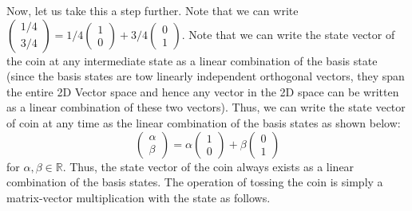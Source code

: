 \documentclass[12pt, oneside]{book}
\theoremstyle{definition}
\theoremstyle{definition}
\theoremstyle{remark}
\begin{document}
Now, let us take this a step further. Note that we can write $\begin{pmatrix} 1/4 \\ 3/4 \end{pmatrix} = 1/4 \begin{pmatrix} 1 \\ 0 \end{pmatrix} + 3/4 \begin{pmatrix} 0 \\1\end{pmatrix}$. Note that we can write the state vector of the coin at any intermediate state as a linear combination of the basis state (since the basis states are tow linearly independent orthogonal vectors, they span the entire 2D Vector space and hence any vector in the 2D space can be written as a linear combination of these two vectors). Thus, we can write the state vector of coin at any time as the linear combination of the basis states as shown below:
\[
\begin{pmatrix} \alpha \\ \beta \end{pmatrix} = \alpha \begin{pmatrix} 1 \\ 0 \end{pmatrix} + \beta \begin{pmatrix} 0 \\ 1 \end{pmatrix}
\]
for $\alpha, \beta \in \mathbb{R}$. Thus, the state vector of the coin always exists as a linear combination of the basis states. The operation of tossing the coin is simply a matrix-vector multiplication with the state as follows.
\end{document}
